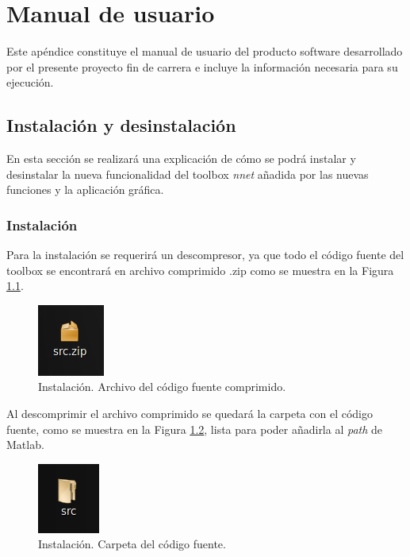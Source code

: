 \chapter{Manual de usuario}
	
	Este apéndice constituye el manual de usuario del producto software desarrollado por el presente proyecto fin de carrera e incluye la información necesaria para su ejecución.
	
	\section{Instalación y desinstalación}
		
		En esta sección se realizará una explicación de cómo se podrá instalar y desinstalar la nueva funcionalidad del toolbox \textit{nnet} añadida por las nuevas funciones y la aplicación gráfica.
		
		\subsection{Instalación}
		
			Para la instalación se requerirá un descompresor, ya que todo el código fuente del toolbox se encontrará en archivo comprimido .zip como se muestra en la Figura \ref{fig:arc_com}.\\
			
			\begin{figure}[htbp]
				\centering
				\includegraphics[scale=1]{img/arc_com.png}
				\caption{Instalación. Archivo del código fuente comprimido.}
				\label{fig:arc_com}
			\end{figure}
			
			Al descomprimir el archivo comprimido se quedará la carpeta con el código fuente, como se muestra en la Figura \ref{fig:car_src}, lista para poder añadirla al \textit{path} de Matlab.\\
			
			\begin{figure}[htbp]
				\centering
				\includegraphics[scale=1]{img/car_src.png}
				\caption{Instalación. Carpeta del código fuente.}
				\label{fig:car_src}
			\end{figure}
			
